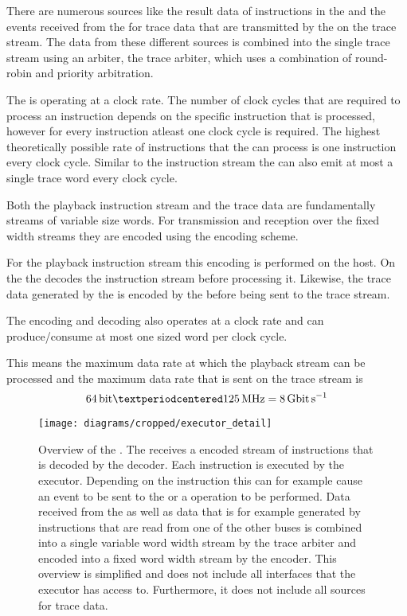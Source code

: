 There are numerous sources like the result data of instructions in the \readCat{} and the events received from the \ASIC{} for trace data that are transmitted by the \pbexec{} on the trace stream. The data from these different sources is combined into the single trace stream using an arbiter, the trace arbiter, which uses a combination of round-robin and priority arbitration.

The \pbexec{} is operating at a \pbExecClock{} clock rate. The number of clock cycles that are required to process an instruction depends on the specific instruction that is processed, however for every instruction atleast one clock cycle is required. The highest theoretically possible rate of instructions that the \pbexec{} can process is one instruction every clock cycle. Similar to the instruction stream the \pbexec{} can also emit at most a single trace word every clock cycle.

Both the playback instruction stream and the trace data are fundamentally streams of variable size words. For transmission and reception over the fixed width \HostARQ{} streams they are encoded using the \UT{} encoding scheme\autocite{karasenko2020neumann}.

For the playback instruction stream this encoding is performed on the host. On the \FPGA{} the \pbexec{} decodes the instruction stream before processing it.
Likewise, the trace data generated by the \pbexec{} is encoded by the \pbexec{} before being sent to the trace stream.

The encoding and decoding also operates at a \pbExecClock{} clock rate and can produce/consume at most one \PhyWordSize{} sized word per clock cycle.

This means the maximum data rate at which the playback stream can be processed and the maximum data rate that is sent on the trace stream is
\[\PhyWordSize{} · \pbExecClock{} = \pbExecBandwidth{}\]

\begin{figure}
\centerline{\texttt{[image: diagrams/cropped/executor\_detail]}}
\caption{Overview of the \pbexec{}. The \pbexec{} receives a \UT{} encoded stream of instructions that is decoded by the \UT{} decoder. Each instruction is executed by the executor. Depending on the instruction this can for example cause an event to be sent to the \ASIC{} or a \JTAG{} operation to be performed. Data received from the \ASIC{} as well as data that is for example generated by instructions that are read from one of the other \FPGA{} buses is combined into a single variable word width stream by the trace arbiter and encoded into a fixed word width stream by the \UT{} encoder.
This overview is simplified and does not include all interfaces that the executor has access to. Furthermore, it does not include all sources for trace data.}\label{diagram:executor}
\end{figure}

